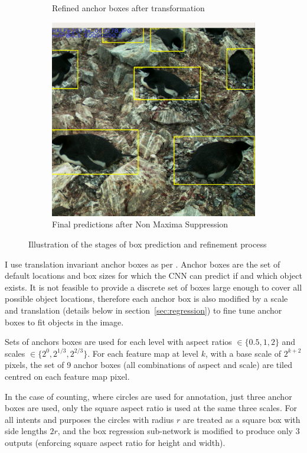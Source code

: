 \begin{figure}
\begin{subfigure}[t]{0.33\textwidth}
  \caption{Refined anchor boxes after transformation}
  \end{subfigure}%
  \begin{subfigure}[t]{0.35\textwidth}
  \includegraphics[width=0.95\linewidth]{figures/object/final.png}
  \caption{Final predictions after Non Maxima Suppression}
  \end{subfigure}%
  \caption{Illustration of the stages of box prediction and refinement process}
  \label{fig:anchor_boxes}
\end{figure}


I use translation invariant anchor boxes as per \cite{Wang2017}. Anchor boxes are the set of default locations and box sizes for which the \gls{CNN} can predict if and which object exists. It is not feasible to provide a discrete set of boxes large enough to cover all possible object locations, therefore each anchor box is also modified by a scale and translation (details below in section~\ref{sec:regression}) to fine tune anchor boxes to fit objects in the image.

Sets of anchors boxes are used for each level with aspect ratios $ \in \{0.5, 1, 2\} $ and scales $ \in \{2^0, 2^{1/3}, 2^{2/3}\} $. For each feature map at level $k$, with a base scale of $ 2^{k + 2} $ pixels, the set of 9 anchor boxes (all combinations of aspect and scale) are tiled centred on each feature map pixel. 

In the case of counting, where circles are used for annotation, just three anchor boxes are used, only the square aspect ratio is used at the same three scales. For all intents and purposes the circles with radius $r$ are treated as a square box with side lengths $2r$, and the box regression sub-network is modified to produce only $3$ outputs (enforcing square aspect ratio for height and width).

